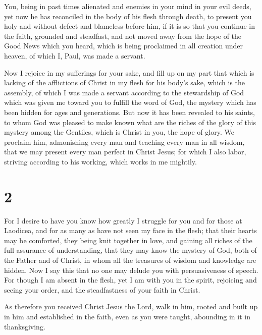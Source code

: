  You, being in past times alienated and enemies in your
mind in your evil deeds,  yet now he has reconciled in the
body of his flesh through death, to present you holy and without defect
and blameless before him,  if it is so that you continue in
the faith, grounded and steadfast, and not moved away from the hope of
the Good News which you heard, which is being proclaimed in all creation
under heaven, of which I, Paul, was made a servant.

 Now I rejoice in my sufferings for your sake, and fill up
on my part that which is lacking of the afflictions of Christ in my
flesh for his body's sake, which is the assembly,  of which
I was made a servant according to the stewardship of God which was given
me toward you to fulfill the word of God,  the mystery
which has been hidden for ages and generations. But now it has been
revealed to his saints,  to whom God was pleased to make
known what are the riches of the glory of this mystery among the
Gentiles, which is Christ in you, the hope of glory.  We
proclaim him, admonishing every man and teaching every man in all
wisdom, that we may present every man perfect in Christ Jesus;
 for which I also labor, striving according to his working,
which works in me mightily.

\hypertarget{section-1}{%
\section{2}\label{section-1}}

 For I desire to have you know how greatly I struggle for
you and for those at Laodicea, and for as many as have not seen my face
in the flesh;  that their hearts may be comforted, they
being knit together in love, and gaining all riches of the full
assurance of understanding, that they may know the mystery of God, both
of the Father and of Christ,  in whom all the treasures of
wisdom and knowledge are hidden.  Now I say this that no one
may delude you with persuasiveness of speech.  For though I
am absent in the flesh, yet I am with you in the spirit, rejoicing and
seeing your order, and the steadfastness of your faith in Christ.

 As therefore you received Christ Jesus the Lord, walk in
him,  rooted and built up in him and established in the
faith, even as you were taught, abounding in it in thanksgiving.

